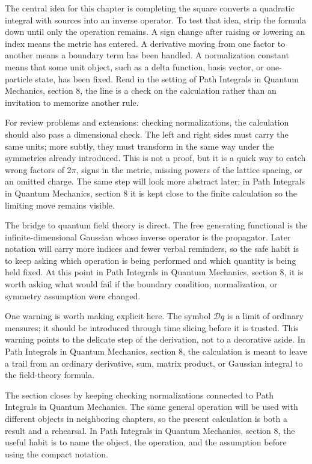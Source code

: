 The central idea for this chapter is completing the square converts a quadratic integral with sources into an inverse operator.  To test that idea, strip the formula down until only the operation remains.  A sign change after raising or lowering an index means the metric has entered.  A derivative moving from one factor to another means a boundary term has been handled.  A normalization constant means that some unit object, such as a delta function, basis vector, or one-particle state, has been fixed.  Read in the setting of Path Integrals in Quantum Mechanics, section 8, the line is a check on the calculation rather than an invitation to memorize another rule.

For review problems and extensions: checking normalizations, the calculation should also pass a dimensional check.  The left and right sides must carry the same units; more subtly, they must transform in the same way under the symmetries already introduced.  This is not a proof, but it is a quick way to catch wrong factors of \(2\pi\), signs in the metric, missing powers of the lattice spacing, or an omitted charge.  The same step will look more abstract later; in Path Integrals in Quantum Mechanics, section 8 it is kept close to the finite calculation so the limiting move remains visible.

The bridge to quantum field theory is direct.  The free generating functional is the infinite-dimensional Gaussian whose inverse operator is the propagator.  Later notation will carry more indices and fewer verbal reminders, so the safe habit is to keep asking which operation is being performed and which quantity is being held fixed.  At this point in Path Integrals in Quantum Mechanics, section 8, it is worth asking what would fail if the boundary condition, normalization, or symmetry assumption were changed.

One warning is worth making explicit here.  The symbol \(\mathcal D q\) is a limit of ordinary measures; it should be introduced through time slicing before it is trusted.  This warning points to the delicate step of the derivation, not to a decorative aside.  In Path Integrals in Quantum Mechanics, section 8, the calculation is meant to leave a trail from an ordinary derivative, sum, matrix product, or Gaussian integral to the field-theory formula.

The section closes by keeping checking normalizations connected to Path Integrals in Quantum Mechanics.  The same general operation will be used with different objects in neighboring chapters, so the present calculation is both a result and a rehearsal.  In Path Integrals in Quantum Mechanics, section 8, the useful habit is to name the object, the operation, and the assumption before using the compact notation.



